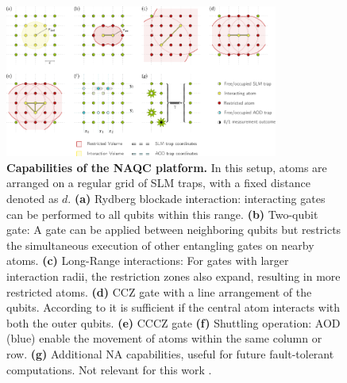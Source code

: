 \begin{figure}[htbp]
  \centering
    \includegraphics[width=0.8\textwidth]{figures/NeutralAtomFeatures.pdf}
    \caption[Capabilities of the NAQC platform.]{\textbf{Capabilities of the NAQC platform.} In this setup, atoms are arranged on a regular grid of \ac{SLM} traps, with a fixed distance denoted as $d$.
  \textbf{(a)} Rydberg blockade interaction: interacting gates can be performed to all qubits within this range.
  \textbf{(b)} Two-qubit gate: A gate can be applied between neighboring qubits but restricts the simultaneous execution of other entangling gates on nearby atoms.
   \textbf{(c)} Long-Range interactions: For gates with larger interaction radii, the restriction zones also expand, resulting in more restricted atoms.
  \textbf{(d)} CCZ gate with a line arrangement of the qubits. 
  According to \cite{Levine_2019} it is sufficient if the central atom interacts with both the outer qubits.
  \textbf{(e)} CCCZ gate 
  \textbf{(f)} Shuttling operation: \ac{AOD} (blue) enable the movement of atoms within the same column or row.
  \textbf{(g)} Additional NA capabilities, useful for future fault-tolerant computations. Not relevant for this work
   \parencite{Schmid_2024_NeutralAtomBasics}.
}\label{fig:NeutralAtomFeatures}
\end{figure}
